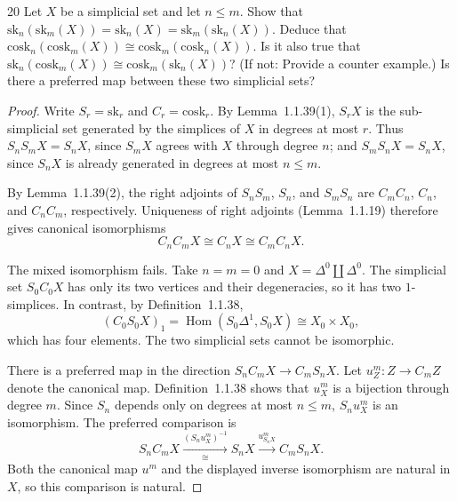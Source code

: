 \begin{exercise}{20}
Let $X$ be a simplicial set and let $n\le m$. Show that
$\mathrm{sk}_n(\mathrm{sk}_m(X))=\mathrm{sk}_n(X)
=\mathrm{sk}_m(\mathrm{sk}_n(X))$. Deduce that
$\mathrm{cosk}_n(\mathrm{cosk}_m(X))\cong
\mathrm{cosk}_m(\mathrm{cosk}_n(X))$. Is it also true that
$\mathrm{sk}_n(\mathrm{cosk}_m(X))\cong
\mathrm{cosk}_m(\mathrm{sk}_n(X))$? (If not: Provide a counter
example.) Is there a preferred map between these two simplicial sets?

\begin{proof}
Write $S_r=\mathrm{sk}_r$ and $C_r=\mathrm{cosk}_r$.
By Lemma~1.1.39(1), $S_rX$ is the sub-simplicial set generated by
the simplices of $X$ in degrees at most $r$.
Thus $S_nS_mX=S_nX$, since $S_mX$ agrees with $X$ through degree
$n$; and $S_mS_nX=S_nX$, since $S_nX$ is already generated in
degrees at most $n\le m$.

By Lemma~1.1.39(2), the right adjoints of $S_nS_m$, $S_n$, and
$S_mS_n$ are $C_mC_n$, $C_n$, and $C_nC_m$, respectively.
Uniqueness of right adjoints (Lemma~1.1.19) therefore gives canonical
isomorphisms
\[
 C_nC_mX\cong C_nX\cong C_mC_nX.
\]

The mixed isomorphism fails. Take $n=m=0$ and
$X=\Delta^0\amalg\Delta^0$.
The simplicial set $S_0C_0X$ has only its two vertices and their
degeneracies, so it has two $1$-simplices.
In contrast, by Definition~1.1.38,
\[
 (C_0S_0X)_1
 =\operatorname{Hom}(S_0\Delta^1,S_0X)
 \cong X_0\times X_0,
\]
which has four elements. The two simplicial sets cannot be isomorphic.

There is a preferred map in the direction $S_nC_mX\to C_mS_nX$.
Let $u_Z^m\colon Z\to C_mZ$ denote the canonical map.
Definition~1.1.38 shows that $u_X^m$ is a bijection through degree
$m$. Since $S_n$ depends only on degrees at most $n\le m$,
$S_nu_X^m$ is an isomorphism. The preferred comparison is
\[
 S_nC_mX\xrightarrow[\cong]{(S_nu_X^m)^{-1}}S_nX
          \xrightarrow{u_{S_nX}^m}C_mS_nX.
\]
Both the canonical map $u^m$ and the displayed inverse isomorphism
are natural in $X$, so this comparison is natural.
\end{proof}
\end{exercise}
